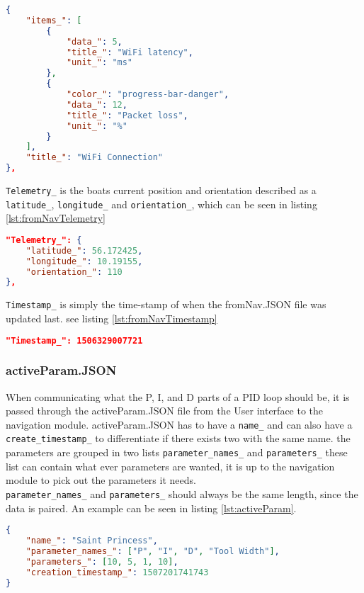 \begin{lstlisting}[caption = {Example of an object in Status_ in fromNav.JSON}, captionpos=b, label={lst:fromNavStatusItem}, language=json,firstnumber=1]
{
    "items_": [
        {
            "data_": 5,
            "title_": "WiFi latency",
            "unit_": "ms"
        },
        {
            "color_": "progress-bar-danger",
            "data_": 12,
            "title_": "Packet loss",
            "unit_": "%"
        }
    ],
    "title_": "WiFi Connection"
},
\end{lstlisting}

\texttt{Telemetry_} is the boats current position and orientation described as a \texttt{latitude_}, \texttt{longitude_} and \texttt{orientation_}, which can be seen in listing \ref{lst:fromNavTelemetry}

\begin{lstlisting}[caption = {Example of an Telemetry_ object in fromNav.JSON}, captionpos=b, label={lst:fromNavTelemetry}, language=json,firstnumber=1]
"Telemetry_": {
    "latitude_": 56.172425,
    "longitude_": 10.19155,
    "orientation_": 110
},
\end{lstlisting}

\texttt{Timestamp_} is simply the time-stamp of when the fromNav.JSON file was updated last. see listing \ref{lst:fromNavTimestamp} 

\begin{lstlisting}[caption = {Example of an Timestamp_ object in fromNav.JSON}, captionpos=b, label={lst:fromNavTimestamp}, language=json,firstnumber=1]
"Timestamp_": 1506329007721
\end{lstlisting}


\subsubsection{activeParam.JSON}
\label{sec:active_param}
When communicating what the P, I, and D parts of a PID loop should be, it is passed through the activeParam.JSON file from the User interface to the navigation module. activeParam.JSON has to have a \texttt{name_} and can also have a \texttt{create_timestamp_} to differentiate if there exists two with the same name. the parameters are grouped in two lists \texttt{parameter_names_} and \texttt{parameters_} these list can contain what ever parameters are wanted, it is up to the navigation module to pick out the parameters it needs.\\
\texttt{parameter_names_} and \texttt{parameters_} should always be the same length, since the data is paired.
An example can be seen in listing \ref{lst:activeParam}.
\begin{lstlisting}[caption = {Example of activeParam.JSON}, captionpos=b, label={lst:activeParam}, language=json,firstnumber=1]
{
	"name_": "Saint Princess",
	"parameter_names_": ["P", "I", "D", "Tool Width"],
	"parameters_": [10, 5, 1, 10],
	"creation_timestamp_": 1507201741743
}
\end{lstlisting}


